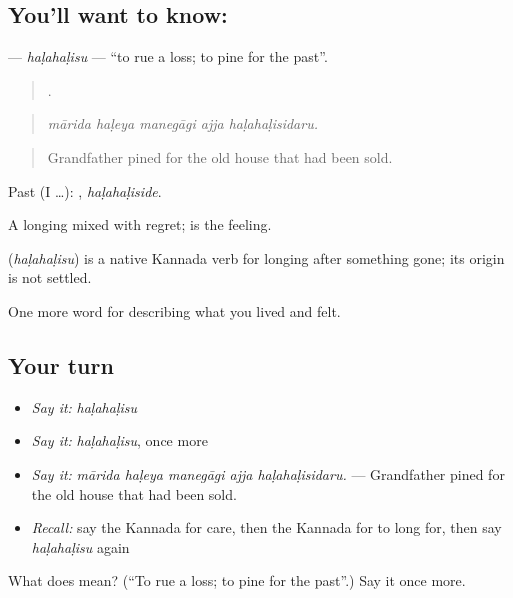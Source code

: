 \subsection*{You'll want to know: }
\textbf{} — \emph{haḷahaḷisu} — \textquotedblleft{}to rue a loss; to pine for the past\textquotedblright{}.

\begin{quote}
    .
\end{quote}

\begin{quote}
\emph{mārida haḷeya manegāgi ajja haḷahaḷisidaru.}
\end{quote}

\begin{quote}
Grandfather pined for the old house that had been sold.
\end{quote}

Past (I …): , \emph{haḷahaḷiside}.

A longing mixed with regret;  is the feeling.

\begin{cousinweb}
\textbf{} (\emph{haḷahaḷisu}) is a native Kannada verb for longing after something gone; its origin is not settled.
\end{cousinweb}

\begin{grammarlens}[title={What you've built}]
One more word for describing what you lived and felt.
\end{grammarlens}

\subsection*{Your turn}
\begin{itemize}
\raggedright
  \item \emph{Say it:} \emph{haḷahaḷisu}
  \item \emph{Say it:} \emph{haḷahaḷisu}, once more
  \item \emph{Say it:} \emph{mārida haḷeya manegāgi ajja haḷahaḷisidaru.} — Grandfather pined for the old house that had been sold.
  \item \emph{Recall:} say the Kannada for care, then the Kannada for to long for, then say \emph{haḷahaḷisu} again
\end{itemize}

\begin{tcolorbox}[breakable,colback=teal!4,colframe=teal!35!black,title={Before you move on}]
What does  mean? (\textquotedblleft{}To rue a loss; to pine for the past\textquotedblright{}.) Say it once more.
\end{tcolorbox}
